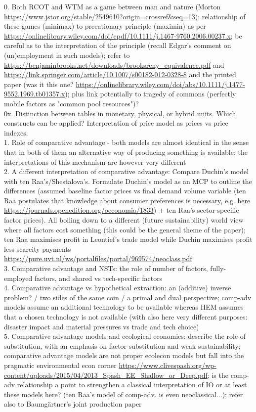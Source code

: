 \documentclass{article}
\begin{document}
\begin{refsection}
0. Both RCOT and WTM as a game between man and nature (Morton \url{https://www.jstor.org/stable/2549610?origin=crossref&seq=13}); relationship of these games (minimax) to precationary principle (maximin) as per \url{https://onlinelibrary.wiley.com/doi/epdf/10.1111/j.1467-9760.2006.00237.x}; be careful as to the interpretation of the principle (recall Edgar's comment on (un)employment in such models); refer to \url{https://benjaminbrooks.net/downloads/brooksreny_equivalence.pdf} and \url{https://link.springer.com/article/10.1007/s00182-012-0328-8} and the printed paper (was it this one? \url{https://onlinelibrary.wiley.com/doi/abs/10.1111/j.1477-9552.1969.tb01357.x}); plus link potentially to tragedy of commons (perfectly mobile factors as "common pool resources")? \\
0x. Distinction between tables in monetary, physical, or hybrid units. Which constructs can be applied? Interpretation of price model as prices vs price indexes.\\
1. Role of comparative advantage - both models are almost identical in the sense that in both of them an alternative way of producing something is available; the interpretations of this mechanism are however very different \\
2. A different interpretation of comparative advantage: Compare Duchin's model with ten Raa's/Shestalova's. Formulate Duchin's model as an MCP to outline the differences (assumed baseline factor prices vs final demand volume variable (ten Raa postulates that knowledge about consumer preferences is necessary, e.g. here \url{https://journals.openedition.org/oeconomia/1833}) + ten Raa's sector-specific factor prices). All boiling down to a different (future sustainability) world view where all factors cost something (this could be the general theme of the paper); ten Raa maximises profit in Leontief's trade model while Duchin maximises profit less scarcity payments \url{https://pure.uvt.nl/ws/portalfiles/portal/969574/neoclass.pdf}\\
3. Comparative advantage and NSTs: the role of number of factors, fully-employed factors, and shared vs tech-specific factors \\
4. Comparative advantage vs hypothetical extraction: an (additive) inverse problem? / two sides of the same coin / a primal and dual perspective; comp-adv models assume an additional technology to be available whereas HEM assumes that a chosen technology is not available (with also here very different purposes: disaster impact and material pressures vs trade and tech choice) \\
5. Comparative advantage models and ecological economics: describe the role of substitution, with an emphasis on factor substitution and weak sustainability; comparative advantage models are not proper ecolecon models but fall into the pragmatic environmental econ corner \url{https://www.clivespash.org/wp-content/uploads/2015/04/2013_Spash_EE_Shallow_or_Deep.pdf}; is the comp-adv relationship a point to strengthen a classical interpretation of IO or at least these models here? (ten Raa's model of comp-adv. is even neoclassical...); refer also to Baumgärtner's joint production paper


\end{refsection}
\end{document}
